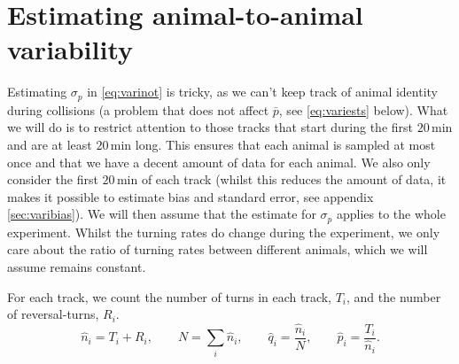 \documentclass[12pt]{article}
\newcommand{\mins}[1][\,]{#1\mathrm{min}}
\begin{document}
\section{Estimating animal-to-animal variability}\label{sec:variest}

Estimating $\sigma_p$ in \eqref{eq:varinot} is tricky, as we can't keep track of animal identity during collisions (a problem that does not affect $\bar{p}$, see \eqref{eq:variests} below). What we will do is to restrict attention to those tracks that start during the first $20\mins$ and are at least $20\mins$ long. This ensures that each animal is sampled at most once and that we have a decent amount of data for each animal. We also only consider the first $20\mins$ of each track (whilst this reduces the amount of data, it makes it possible to estimate bias and standard error, see appendix \ref{sec:varibias}). We will then assume that the estimate for $\sigma_p$ applies to the whole experiment. Whilst the turning rates do change during the experiment, we only care about the ratio of turning rates between different animals, which we will assume remains constant.

For each track, we count the number of turns in each track, $T_i$, and the number of reversal-turns, $R_i$.
%
\begin{equation}\label{eq:varesttype}
  \hat{n}_i = T_i+R_i, \qquad
  N = \sum_i \hat{n}_i, \qquad
  \hat{q}_i = \frac{\hat{n}_i}{N}, \qquad
  \hat{p}_i = \frac{T_i}{\hat{n}_i}.
\end{equation}
%

\end{document}
